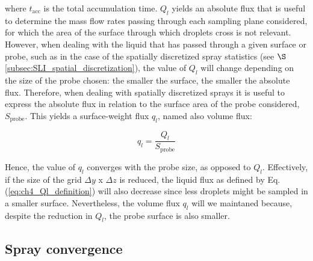 where $t_\mathrm{acc}$ is the total accumulation time. $Q_l$ yields an absolute flux that is useful to determine the mass flow rates passing through each sampling plane considered, for which the area of the surface through which droplets cross is not relevant. However, when dealing with the liquid that has passed through a given surface or probe, such as in the case of the spatially discretized spray statistics (see $\S$\ref{subsec:SLI_spatial_discretization}), the value of $Q_l$ will change depending on the size of the probe chosen: the smaller the surface, the smaller the absolute flux. Therefore, when dealing with spatially discretized sprays it is useful to express the absolute flux in relation to the surface area of the probe considered, $S_\mathrm{probe}$. This yields a surface-weight flux $q_l$, named also volume flux:

\begin{equation}
\label{eq:ch4_Ql_definition}
q_l = \frac{Q_l}{S_\mathrm{probe}}
\end{equation}

Hence, the value of $q_l$ converges with the probe size, as opposed to $Q_l$. Effectively, if the size of the grid $\Delta y$ x $\Delta z$ is reduced, the liquid flux as defined by Eq. (\ref{eq:ch4_Ql_definition}) will also decrease since less droplets might be sampled in a smaller surface. Nevertheless, the volume flux $q_l$ will we maintaned because, despite the reduction in $Q_l$, the probe surface is also smaller.

\clearpage

%




\subsection{Spray convergence}
\label{subsec:SLI_spray_convergence}

